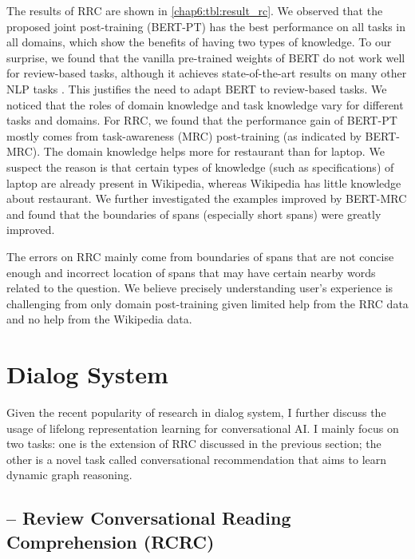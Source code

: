 The results of RRC are shown in \ref{chap6:tbl:result_rc}. 
We observed that the proposed joint post-training (BERT-PT) has the best performance on all tasks in all domains, which show the benefits of having two types of knowledge.
To our surprise, we found that the vanilla pre-trained weights of BERT do not work well for review-based tasks, although it achieves state-of-the-art results on many other NLP tasks \cite{devlin2018bert}.
This justifies the need to adapt BERT to review-based tasks.
We noticed that the roles of domain knowledge and task knowledge vary for different tasks and domains.
For RRC, we found that the performance gain of BERT-PT mostly comes from task-awareness (MRC) post-training (as indicated by BERT-MRC).
The domain knowledge helps more for restaurant than for laptop.
We suspect the reason is that certain types of knowledge (such as specifications) of laptop are already present in Wikipedia, whereas Wikipedia has little knowledge about restaurant.
We further investigated the examples improved by BERT-MRC and found that the boundaries of spans (especially short spans) were greatly improved. 

The errors on RRC mainly come from boundaries of spans that are not concise enough and incorrect location of spans that may have certain nearby words related to the question. 
We believe precisely understanding user's experience is challenging from only domain post-training given limited help from the RRC data and no help from the Wikipedia data.

\section{Dialog System}
\label{chap6:sec:dialog}

Given the recent popularity of research in dialog system, I further discuss the usage of lifelong representation learning for conversational AI.
I mainly focus on two tasks: one is the extension of RRC discussed in the previous section; the other is a novel task called conversational recommendation that aims to learn dynamic graph reasoning.

\subsection{-- Review Conversational Reading Comprehension (RCRC)}
\label{chap6:sec:rcrc}


